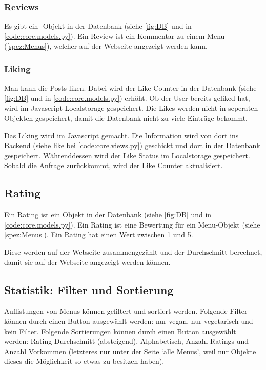 \subsubsection{Reviews} \label{spez:Reviews}

Es gibt ein -Objekt in der Datenbank (siehe \ref{fig:DB} und in
\ref{code:core.models.py}). Ein Review ist ein Kommentar zu einem Menu
(\ref{spez:Menus}), welcher auf der Webseite angezeigt werden kann.

\subsubsection{Liking} \label{spez:Liking}

Man kann die Posts liken. Dabei wird der Like Counter in der Datenbank (siehe
\ref{fig:DB} und in \ref{code:core.models.py}) erhöht. Ob der User bereits
geliked hat, wird im Javascript Localstorage gespeichert. Die Likes werden nicht
in seperaten Objekten gespeichert, damit die Datenbank nicht zu viele Einträge
bekommt.

Das Liking wird im Javascript gemacht. Die Information wird von dort ins Backend
(siehe like bei \ref{code:core.views.py}) geschickt und dort in der Datenbank
gespeichert. Währenddessen wird der Like Status im Localstorage gespeichert.
Sobald die Anfrage zurückkommt, wird der Like Counter aktualisiert.

\subsection{Rating} \label{spez:Rating}

Ein Rating ist ein Objekt in der Datenbank (siehe \ref{fig:DB} und in
\ref{code:core.models.py}). Ein Rating ist eine Bewertung für ein Menu-Objekt
(siehe \ref{spez:Menus}). Ein Rating hat einen Wert zwischen 1 und 5.

Diese werden auf der Webseite zusammengezählt und der Durchschnitt berechnet,
damit sie auf der Webseite angezeigt werden können.


\subsection{Statistik: Filter und Sortierung} \label{spez:Statistik}

Auflistungen von Menus können gefiltert und sortiert werden. Folgende Filter
können durch einen Button ausgewählt werden: nur vegan, nur vegetarisch und kein
Filter. Folgende Sortierungen können durch einen Button ausgewählt werden:
Rating-Durchschnitt (absteigend), Alphabetisch, Anzahl Ratings und Anzahl
Vorkommen (letzteres nur unter der Seite `alle Menus', weil nur 
Objekte dieses die Möglichkeit so etwas zu besitzen haben).

